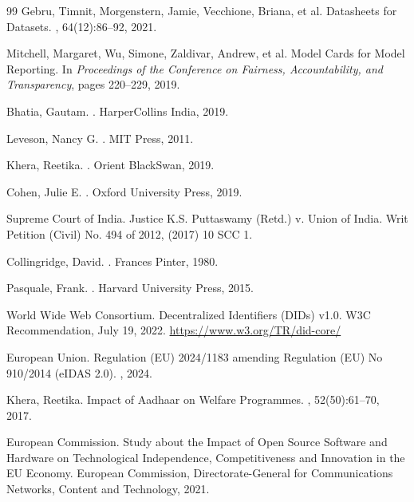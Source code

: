 \begin{thebibliography}{99}
Gebru, Timnit, Morgenstern, Jamie, Vecchione, Briana, et al.
\newblock Datasheets for Datasets.
, 64(12):86--92, 2021.

Mitchell, Margaret, Wu, Simone, Zaldivar, Andrew, et al.
\newblock Model Cards for Model Reporting.
\newblock In {\em Proceedings of the Conference on Fairness, Accountability, and Transparency}, pages 220--229, 2019.

Bhatia, Gautam.
.
\newblock HarperCollins India, 2019.

Leveson, Nancy G.
.
\newblock MIT Press, 2011.

Khera, Reetika.
.
\newblock Orient BlackSwan, 2019.

Cohen, Julie E.
.
\newblock Oxford University Press, 2019.

Supreme Court of India.
\newblock Justice K.S. Puttaswamy (Retd.) v. Union of India.
\newblock Writ Petition (Civil) No. 494 of 2012, (2017) 10 SCC 1.

Collingridge, David.
.
\newblock Frances Pinter, 1980.

Pasquale, Frank.
.
\newblock Harvard University Press, 2015.

World Wide Web Consortium.
\newblock Decentralized Identifiers (DIDs) v1.0.
\newblock W3C Recommendation, July 19, 2022.
\newblock \url{https://www.w3.org/TR/did-core/}

European Union.
\newblock Regulation (EU) 2024/1183 amending Regulation (EU) No 910/2014 (eIDAS 2.0).
, 2024.

Khera, Reetika.
\newblock Impact of Aadhaar on Welfare Programmes.
, 52(50):61--70, 2017.

European Commission.
\newblock Study about the Impact of Open Source Software and Hardware on Technological Independence, Competitiveness and Innovation in the EU Economy.
\newblock European Commission, Directorate-General for Communications Networks, Content and Technology, 2021.

\end{thebibliography}

